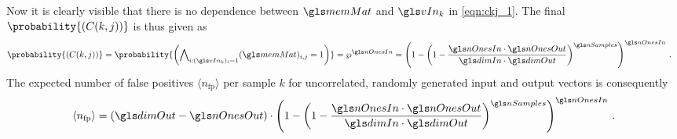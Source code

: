 Now it is clearly visible that there is no dependence between \(\memMat\) and \(\vIn_k\) in \cref{eqn:ckj_1}. The final $\probability{(C(k, j))}$ is thus given as
\begin{align}
\probability{(C(k, j))} &= \probability{\left(
			\bigwedge\nolimits_{i : (\vIn_k)_i = 1} (\memMat)_{i, j} = 1 \right)}
			= \wp^{\nOnesIn} = \left(1 - \left(1 - \frac{\nOnesIn \cdot \nOnesOut}{\dimIn \cdot \dimOut}\right)^{\nSamples}\right)^{\nOnesIn} \,.
\end{align}
The expected number of false positives \(\langle n_{\mathrm{fp}} \rangle\) per sample \(k\) for uncorrelated, randomly generated input and output vectors is consequently
\begin{align}
\langle n_{\mathrm{fp}} \rangle = (\dimOut - \nOnesOut) \cdot \left(1 - \left(1 - \frac{\nOnesIn \cdot \nOnesOut}{\dimIn \cdot \dimOut}\right)^{\nSamples}\right)^{\nOnesIn} \,.
\label{eqn:expected_err}
\end{align}
